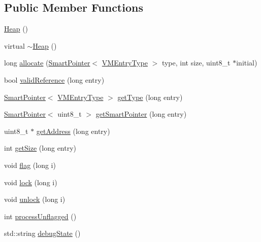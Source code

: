 \subsection*{Public Member Functions}
\begin{DoxyCompactItemize}
\item 
\hyperlink{class_v_m_1_1_heap_ad74fb4f284800f4729be3480bc396ccc}{Heap} ()
\item 
virtual \hyperlink{class_v_m_1_1_heap_a30eb99e49c17b7c20a12125f0c33ba0d}{$\sim$\-Heap} ()
\item 
long \hyperlink{class_v_m_1_1_heap_ad4af8cf1e9b1b4801b03d94cb5344ee0}{allocate} (\hyperlink{_smart_pointer_8hpp_afdd8d4ba81c3fcbdeacf1dafba2accfb}{Smart\-Pointer}$<$ \hyperlink{class_v_m_1_1_v_m_entry_type}{V\-M\-Entry\-Type} $>$ type, int size, uint8\-\_\-t $\ast$initial)
\item 
bool \hyperlink{class_v_m_1_1_heap_a55b3e734c3437a02620684466aa5bc8a}{valid\-Reference} (long entry)
\item 
\hyperlink{_smart_pointer_8hpp_afdd8d4ba81c3fcbdeacf1dafba2accfb}{Smart\-Pointer}$<$ \hyperlink{class_v_m_1_1_v_m_entry_type}{V\-M\-Entry\-Type} $>$ \hyperlink{class_v_m_1_1_heap_ac0fc2201e52d83ce9d1a3f69528f2954}{get\-Type} (long entry)
\item 
\hyperlink{_smart_pointer_8hpp_afdd8d4ba81c3fcbdeacf1dafba2accfb}{Smart\-Pointer}$<$ uint8\-\_\-t $>$ \hyperlink{class_v_m_1_1_heap_afd540e904508b10ce3a1e547386622c0}{get\-Smart\-Pointer} (long entry)
\item 
uint8\-\_\-t $\ast$ \hyperlink{class_v_m_1_1_heap_a111c75b74ccab7b481ec4c578a8a8cd1}{get\-Address} (long entry)
\item 
int \hyperlink{class_v_m_1_1_heap_a1bf0adf9ed907280cfa1ac07a008da46}{get\-Size} (long entry)
\item 
void \hyperlink{class_v_m_1_1_heap_aa816ee55074c8943b8c7055efd0bb271}{flag} (long i)
\item 
void \hyperlink{class_v_m_1_1_heap_a9ff0e85c497091139634a9c38d46fb72}{lock} (long i)
\item 
void \hyperlink{class_v_m_1_1_heap_a0be6cc847754a25dacddb87784e9196b}{unlock} (long i)
\item 
int \hyperlink{class_v_m_1_1_heap_ace7f82504bd848493b74eefde4489c7c}{process\-Unflagged} ()
\item 
std\-::string \hyperlink{class_v_m_1_1_heap_ace8a1c5e19d042f27f3b1754674c06fa}{debug\-State} ()
\end{DoxyCompactItemize}


